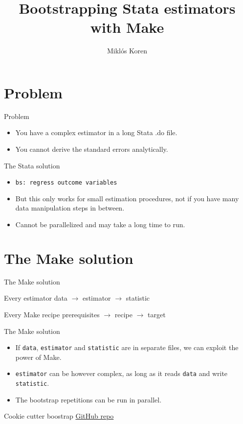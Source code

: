 \documentclass[
  ignorenonframetext,
  aspectratio=54,
]{beamer}
\title{Bootstrapping Stata estimators with Make}
\author{Miklós Koren}
\date{}
\providecommand{\tightlist}{%
  \setlength{\itemsep}{0pt}\setlength{\parskip}{0pt}}
\begin{document}
\frame{\titlepage}

\hypertarget{problem}{%
\section{Problem}\label{problem}}

\begin{frame}{Problem}
\protect\hypertarget{problem-1}{}
\begin{itemize}
\tightlist
\item
  You have a complex estimator in a long Stata .do file.
\item
  You cannot derive the standard errors analytically.
\end{itemize}
\end{frame}

\begin{frame}[fragile]{The Stata solution}
\protect\hypertarget{the-stata-solution}{}
\begin{itemize}
\tightlist
\item
  \texttt{bs:\ regress\ outcome\ variables}
\item
  But this only works for small estimation procedures, not if you have
  many data manipulation steps in between.
\item
  Cannot be parallelized and may take a long time to run.
\end{itemize}
\end{frame}

\hypertarget{the-make-solution}{%
\section{The Make solution}\label{the-make-solution}}

\begin{frame}{The Make solution}
\protect\hypertarget{the-make-solution-1}{}
\begin{block}{Every estimator}
\protect\hypertarget{every-estimator}{}
data \(\to\) estimator \(\to\) statistic
\end{block}

\begin{block}{Every Make recipe}
\protect\hypertarget{every-make-recipe}{}
prerequisites \(\to\) recipe \(\to\) target
\end{block}
\end{frame}

\begin{frame}[fragile]{The Make solution}
\protect\hypertarget{the-make-solution-2}{}
\begin{itemize}
\tightlist
\item
  If \texttt{data}, \texttt{estimator} and \texttt{statistic} are in
  separate files, we can exploit the power of Make.
\item
  \texttt{estimator} can be however complex, as long as it reads
  \texttt{data} and write \texttt{statistic}.
\item
  The bootstrap repetitions can be run in parallel.
\end{itemize}
\end{frame}

\begin{frame}{Cookie cutter boostrap}
\protect\hypertarget{cookie-cutter-boostrap}{}
\href{https://github.com/codedthinking/cookiecutter-bootstrap-stata}{GitHub
repo}
\end{frame}
\end{document}
